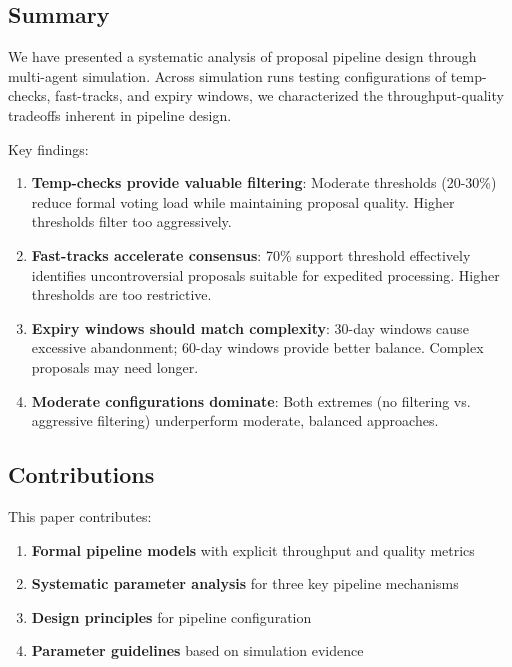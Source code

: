 
\subsection{Summary}

We have presented a systematic analysis of proposal pipeline design through multi-agent simulation. Across \experimentruns{} simulation runs testing configurations of temp-checks, fast-tracks, and expiry windows, we characterized the throughput-quality tradeoffs inherent in pipeline design.

Key findings:

\begin{enumerate}
    \item \textbf{Temp-checks provide valuable filtering}: Moderate thresholds (20-30\%) reduce formal voting load while maintaining proposal quality. Higher thresholds filter too aggressively.

    \item \textbf{Fast-tracks accelerate consensus}: 70\% support threshold effectively identifies uncontroversial proposals suitable for expedited processing. Higher thresholds are too restrictive.

    \item \textbf{Expiry windows should match complexity}: 30-day windows cause excessive abandonment; 60-day windows provide better balance. Complex proposals may need longer.

    \item \textbf{Moderate configurations dominate}: Both extremes (no filtering vs. aggressive filtering) underperform moderate, balanced approaches.
\end{enumerate}

\subsection{Contributions}

This paper contributes:

\begin{enumerate}
    \item \textbf{Formal pipeline models} with explicit throughput and quality metrics
    \item \textbf{Systematic parameter analysis} for three key pipeline mechanisms
    \item \textbf{Design principles} for pipeline configuration
    \item \textbf{Parameter guidelines} based on simulation evidence
\end{enumerate}

